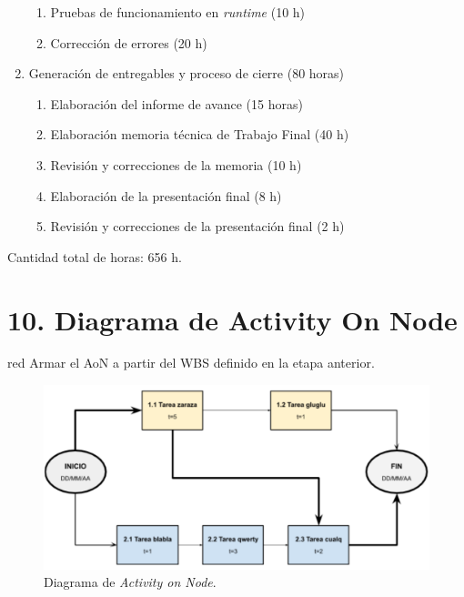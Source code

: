 \documentclass[
11pt, %
]{charter}
\begin{document}
\begin{enumerate}
\begin{enumerate}
		\item Pruebas de funcionamiento en \textit{runtime} (10 h)
		\item Corrección de errores (20 h)
	\end{enumerate}
	\item Generación de entregables y proceso de cierre (80 horas)
	\begin{enumerate}
		\item Elaboración del informe de avance (15 horas)
		\item Elaboración memoria técnica de Trabajo Final (40 h)
		\item Revisión y correcciones de la memoria (10 h)
		\item Elaboración de la presentación final (8 h)
		\item Revisión y correcciones de la presentación final (2 h)
	\end{enumerate}
\end{enumerate}

Cantidad total de horas: 656 h.

\section{10. Diagrama de Activity On Node}
\label{sec:AoN}

\begin{consigna}{red}
Armar el AoN a partir del WBS definido en la etapa anterior. 



\end{consigna}

\begin{figure}[htpb]
\centering 
\includegraphics[width=.8\textwidth]{./Figuras/AoN.png}
\caption{Diagrama de \textit{Activity on Node}.}
\label{fig:AoN}
\end{figure}
\end{document}
